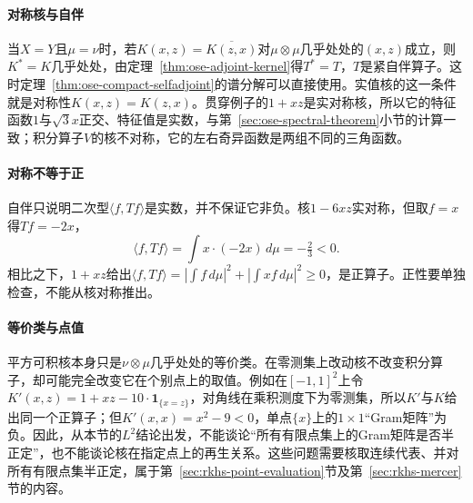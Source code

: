 \paragraph{对称核与自伴}
当$X=Y$且$\mu=\nu$时，若$K(x,z)=\overline{K(z,x)}$对$\mu\otimes\mu$几乎处处的$(x,z)$成立，则$K^*=K$几乎处处，由定理~\ref{thm:ose-adjoint-kernel}得$T^*=T$，$T$是紧自伴算子。这时定理~\ref{thm:ose-compact-selfadjoint}的谱分解可以直接使用。实值核的这一条件就是对称性$K(x,z)=K(z,x)$。贯穿例子的$1+xz$是实对称核，所以它的特征函数$1$与$\sqrt3x$正交、特征值是实数，与第~\ref{sec:ose-spectral-theorem}小节的计算一致；积分算子$V$的核不对称，它的左右奇异函数是两组不同的三角函数。

\paragraph{对称不等于正}
自伴只说明二次型$\langle f,Tf\rangle$是实数，并不保证它非负。核$1-6xz$实对称，但取$f=x$得$Tf=-2x$，
\[
  \langle f,Tf\rangle=\int x\cdot(-2x)\,d\mu=-\tfrac23<0 .
\]
相比之下，$1+xz$给出$\langle f,Tf\rangle=|\int f\,d\mu|^2+|\int xf\,d\mu|^2\geq0$，是正算子。正性要单独检查，不能从核对称推出。

\paragraph{等价类与点值}
平方可积核本身只是$\nu\otimes\mu$几乎处处的等价类。在零测集上改动核不改变积分算子，却可能完全改变它在个别点上的取值。例如在$[-1,1]^2$上令$K'(x,z)=1+xz-10\cdot\mathbf 1_{\{x=z\}}$，对角线在乘积测度下为零测集，所以$K'$与$K$给出同一个正算子；但$K'(x,x)=x^2-9<0$，单点$\{x\}$上的$1\times1$“Gram矩阵”为负。因此，从本节的$L^2$结论出发，不能谈论“所有有限点集上的Gram矩阵是否半正定”，也不能谈论核在指定点上的再生关系。这些问题需要核取连续代表、并对所有有限点集半正定，属于第~\ref{sec:rkhs-point-evaluation}节及第~\ref{sec:rkhs-mercer}节的内容。
